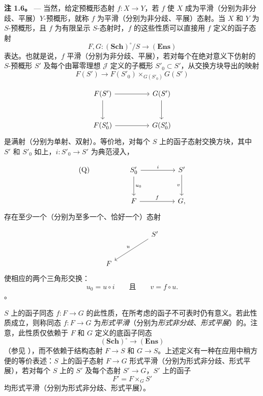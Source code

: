 
\medskip\noindent{}\textbf{注 1.6。} --- 当然，给定预概形态射 \(f:X\to Y\)，若 \(f\) 使 \(X\) 成为平滑（分别为非分歧、平展）\(Y\)-预概形，就称 \(f\) 为平滑（分别为非分歧、平展）态射。当 \(X\) 和 \(Y\) 为 \(S\)-预概形，且 \(f\) 为有限呈示 \(S\)-态射时，\(f\) 的这些性质可以直接用 \(f\) 定义的函子态射 \[
  F,G:(\mathbf{Sch})^\circ/S\longrightarrow(\mathbf{Ens})
\] 表达。也就是说，\(f\) 平滑（分别为非分歧、平展），若对每个在绝对意义下仿射的 \(S\)-预概形 \(S'\) 及每个由幂零理想 \(\mathscr J\) 定义的子概形 \(S'_0\subset S'\)，从交换方块导出的映射 \[
  F(S')\longrightarrow
  F(S'_0)\times_{G(S'_0)}G(S')
\]

 \[
\begin{tikzcd}[column sep=huge,row sep=large]
  F(S') \arrow[r] \arrow[d] & G(S') \arrow[d] \\
  F(S'_0) \arrow[r] & G(S'_0)
\end{tikzcd}
\] 是满射（分别为单射、双射）。等价地，对每个 \(S\) 上的函子态射交换方块，其中 \(S'\) 和 \(S'_0\) 如上，\(i:S'_0\to S'\) 为典范浸入，

 \[
\begin{tikzcd}[column sep=huge,row sep=large]
  \text{\rm(Q)} & S'_0 \arrow[r,"i"] \arrow[d,"u_0"] &
    S' \arrow[d,"v"'] \\
  & F \arrow[r,"f"] & G ,
\end{tikzcd}
\] 存在至少一个（分别为至多一个、恰好一个）态射

 \[
\begin{tikzcd}[column sep=huge,row sep=large]
  & S' \arrow[dl,"u"'] \\
  F &
\end{tikzcd}
\] 使相应的两个三角形交换：\[
  u_0=u\circ i
  \qquad\text{且}\qquad
  v=f\circ u.
\]。

\(S\) 上的函子同态 \(f:F\to G\) 的此性质，在所考虑的函子不可表时仍有意义。若此性质成立，则称同态 \(f:F\to G\) 为\emph{形式平滑}（分别为\emph{形式非分歧}、\emph{形式平展}）的。注意，此性质仅依赖于 \(F\) 和 \(G\) 定义的底函子同态 \[
  (\mathbf{Sch})^\circ\longrightarrow(\mathbf{Ens})
\]（参见 ），而不依赖于结构态射 \(F\to S\) 和 \(G\to S\)。上述定义有一种在应用中稍方便的等价表述：\(S\) 上的函子态射 \(F\to G\) 形式平滑（分别为形式非分歧、形式平展），若对每个 \(S\) 上的 \(S'\) 及每个态射 \(S'\to G\)，\(S'\) 上的函子 \[
  F'=F\times_G S'
\] 均形式平滑（分别为形式非分歧、形式平展）。

